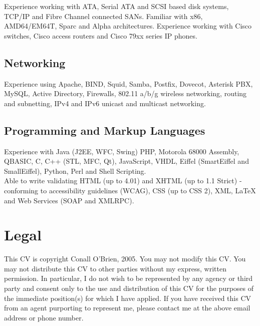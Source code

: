 \documentclass[a4paper, 11pt] {article}
\begin{document}
Experience working with ATA, Serial ATA and SCSI based disk systems, TCP/IP and 
Fibre Channel connected SANs. Familiar with x86, AMD64/EM64T, Sparc and
Alpha architectures. Experience working with Cisco switches, Cisco 
access routers and Cisco 79xx series IP phones.

\subsection*{Networking}

Experience using Apache, BIND, Squid, Samba, Postfix, Dovecot,
Asterisk PBX, MySQL, Active  Directory, Firewalls, 802.11 a/b/g wireless 
networking, routing and subnetting, IPv4 and IPv6 unicast and multicast 
networking.
 

\subsection*{Programming and Markup Languages}

Experience with Java (J2EE, WFC, Swing) PHP, Motorola 68000 Assembly, QBASIC,
C, C++ (STL, MFC, Qt), JavaScript, VHDL, Eiffel (SmartEiffel and 
SmallEiffel), Python, Perl and Shell Scripting. \\

Able to write validating HTML (up to 4.01) and XHTML (up 
to 1.1 Strict) - conforming to accessibility guidelines (WCAG), CSS (up to 
CSS 2), XML, LaTeX and Web Services (SOAP and XMLRPC).

\section*{Legal}

This CV is copyright Conall O'Brien, 2005. You may not modify this
CV. You may not distribute this CV to other parties without my express,
written permission. In particular, I do not wish to be represented by
any agency or third party and consent only to the use and distribution
of this CV for the purposes of the immediate position(s) for which I
have applied. If you have received this CV from an agent purporting to
represent me, please contact me at the above email address or phone
number.
\end{document}

